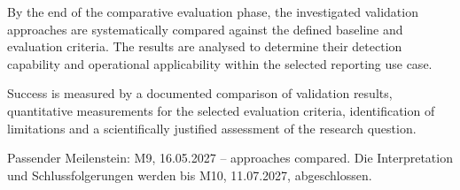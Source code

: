 \begin{itemize}
By the end of the comparative evaluation phase, the investigated validation approaches are systematically compared against the defined baseline and evaluation criteria. The results are analysed to determine their detection capability and operational applicability within the selected reporting use case.

Success is measured by a documented comparison of validation results, quantitative measurements for the selected evaluation criteria, identification of limitations and a scientifically justified assessment of the research question.

Passender Meilenstein: M9, 16.05.2027 – approaches compared. Die Interpretation und Schlussfolgerungen werden bis M10, 11.07.2027, abgeschlossen.

\end{itemize}
